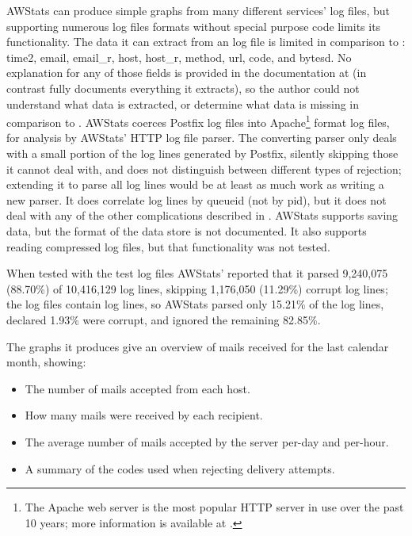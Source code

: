 AWStats can produce simple graphs from many different services' log files,
but supporting numerous log files formats without special purpose code
limits its functionality.  The data it can extract from an 
log file is limited in comparison to \parsername{}: time2, email, email\_r,
host, host\_r, method, url, code, and bytesd.  No explanation for any of
those fields is provided in the documentation at
(in contrast \parsername{} fully documents everything it extracts), so the
author could not understand what data is extracted, or determine what data
is missing in comparison to \parsername{}.  AWStats coerces Postfix log
files into Apache\footnote{The Apache web server is the most popular HTTP
server in use over the past 10 years; more information is available at
.} format log files,
for analysis by AWStats' HTTP log file parser.  The converting parser only
deals with a small portion of the log lines generated by Postfix, silently
skipping those it cannot deal with, and does not distinguish between
different types of rejection; extending it to parse all log lines would be
at least as much work as writing a new parser.  It does correlate log lines
by queueid (not by pid), but it does not deal with any of the other
complications described in .  AWStats supports
saving data, but the format of the data store is not documented.  It also
supports reading compressed log files, but that functionality was not
tested.

When tested with the \numberOFlogFILES{} test log files AWStats' reported
that it parsed 9,240,075 (88.70\%) of 10,416,129 log lines, skipping
1,176,050 (11.29\%) corrupt log lines; the \numberOFlogFILES{} log files
contain \numberOFlogLINES{} log lines, so AWStats parsed only 15.21\% of
the log lines, declared 1.93\% were corrupt, and ignored the remaining
82.85\%.

The graphs it produces give an overview of mails received for the last
calendar month, showing:

\begin{itemize}

    \item The number of mails accepted from each host.

    \item How many mails were received by each recipient.

    \item The average number of mails accepted by the server per-day and
        per-hour.

    \item A summary of the  codes used when rejecting
        delivery attempts.

\end{itemize}

